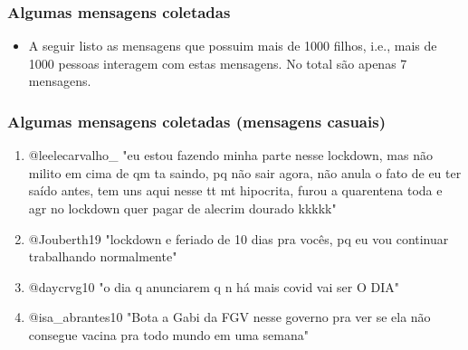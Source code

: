\documentclass[11pt]{beamer}
\theoremstyle{remark}
\theoremstyle{definition}
\theoremstyle{plain}
\begin{document}
	\begin{frame}
		\frametitle{Algumas mensagens coletadas}
		\begin{itemize}
			\item A seguir listo as mensagens que possuim mais de 1000 filhos,
				i.e., mais de 1000 pessoas interagem com estas mensagens.
				No total são apenas 7 mensagens.
		\end{itemize}
		\end{frame}

	\begin{frame}
		\frametitle{Algumas mensagens coletadas (mensagens casuais)}
		\begin{enumerate}
			\item
                @leelecarvalho\_ "eu estou fazendo minha parte nesse
                lockdown, mas não milito em cima de qm ta saindo, pq não
                sair agora, não anula o fato de eu ter saído antes, tem
                uns aqui nesse tt mt hipocrita, furou a quarentena toda
                e agr no lockdown quer pagar de alecrim dourado kkkkk"

			\item @Jouberth19 "lockdown e feriado de 10 dias pra vocês, pq eu vou continuar
				trabalhando normalmente"

			\item @daycrvg10 "o dia q anunciarem q n há mais covid vai ser O DIA"

			\item
                @isa\_abrantes10 "Bota a Gabi da FGV nesse governo pra
                ver se ela não consegue vacina pra todo mundo em uma semana"

		\end{enumerate}
		\end{frame}
\end{document}
